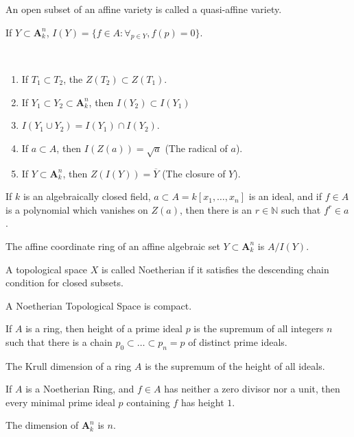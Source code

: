 \documentclass[crop=false,class=article,oneside]{standalone}
\begin{document}
    \begin{definition}
    An open subset of an affine variety is called a quasi-affine variety.
    \end{definition}
    \begin{notation}
    If $Y\subset \textbf{A}_k^n$, $I(Y) = \{f\in A:\forall_{p\in Y}, f(p) = 0\}$.
    \end{notation}
    \begin{theorem}
    \
    \begin{enumerate}
        \item If $T_1\subset T_2$, the  $Z(T_2)\subset Z(T_1)$.
        \item If $Y_1\subset Y_2 \subset \textbf{A}_k^n$, then $I(Y_2)\subset I(Y_1)$
        \item $I(Y_1\cup Y_2) = I(Y_1)\cap I(Y_2)$.
        \item If $a\subset A$, then $I(Z(a)) = \sqrt{a}$ (The radical of $a$).
        \item If $Y\subset \textbf{A}_k^n$, then $Z(I(Y)) = \overline{Y}$ (The closure of $Y$).
    \end{enumerate}
    \end{theorem}
    \begin{theorem}
    If $k$ is an algebraically closed field, $a\subset A=k[x_1,\hdots ,x_n]$ is an ideal, and if $f\in A$ is a polynomial which vanishes on $Z(a)$, then there is an $r\in \mathbb{N}$ such that $f^{r}\in a$.
    \end{theorem}
    \begin{definition}
    The affine coordinate ring of an affine algebraic set $Y\subset \textbf{A}_k^n$ is $A/I(Y)$.
    \end{definition}
    \begin{definition}
    A topological space $X$ is called Noetherian if it satisfies the descending chain condition for closed subsets.
    \end{definition}
    \begin{theorem}
    A Noetherian Topological Space is compact.
    \end{theorem}
    \begin{definition}
    If $A$ is a ring, then height of a prime ideal $p$ is the supremum of all integers $n$ such that there is a chain $p_0\subset \hdots \subset p_n = p$ of distinct prime ideals.
    \end{definition}
    \begin{definition}
    The Krull dimension of a ring $A$ is the supremum of the height of all ideals.
    \end{definition}
    \begin{theorem}
    If $A$ is a Noetherian Ring, and $f\in A$ has neither a zero divisor nor a unit, then every minimal prime ideal $p$ containing $f$ has height $1$.
    \end{theorem}
    \begin{theorem}
    The dimension of $\textbf{A}_k^n$ is $n$.
    \end{theorem}
\end{document}
